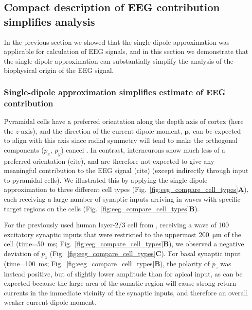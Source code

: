 \documentclass[preprint,10pt,authoryear]{elsarticle}
\begin{document}
\subsection{Compact description of EEG contribution simplifies analysis}\label{subsec:compact}
In the previous section we showed that the single-dipole approximation was applicable for calculation of EEG signals, and in this section we demonstrate that the single-dipole approximation can substantially simplify the analysis of the biophysical origin of the EEG signal.

\subsubsection{Single-dipole approximation simplifies estimate of EEG contribution}

Pyramidal cells have a preferred orientation along the depth axis of cortex (here the $z$-axis), and the direction of the current dipole moment, $\mathbf{p}$, can be expected to align with this axis since
radial symmetry will tend to make the orthogonal components ($p_x$, $p_y$) cancel \citep{HAGEN2018}. 
In contrast, interneurons show much less of a preferred orientation
(cite), and are therefore not expected to give any meaningful contribution to the EEG signal (cite) (except indirectly through input to pyramidal cells).
We illustrated this by applying the single-dipole approximation to three different cell types (Fig.~\ref{fig:eeg_compare_cell_types}\textbf{A}), each receiving a large number of synaptic inputs arriving in waves with specific target regions on the cells (Fig.~\ref{fig:eeg_compare_cell_types}\textbf{B}).

For the previously used human layer-2/3 cell from \cite{EYAL2016},
receiving a wave of 100 excitatory synaptic inputs that were restricted to the uppermost 200~$\si{\um}$ of the cell (time=50~ms; Fig.~\ref{fig:eeg_compare_cell_types}\textbf{B}), we observed a negative deviation of $p_z$ (Fig.~\ref{fig:eeg_compare_cell_types}\textbf{C}). For basal synaptic input (time=100~ms; Fig.~\ref{fig:eeg_compare_cell_types}\textbf{B}), the polarity of $p_z$ was instead positive, but of slightly lower amplitude than for apical input, as can be expected because the large area of the somatic region will cause strong return currents in the immediate vicinity of the synaptic inputs, and therefore an overall weaker current-dipole moment.
\end{document}
